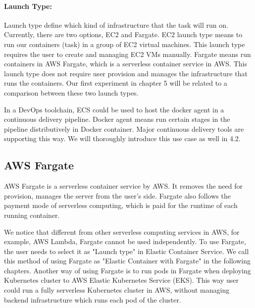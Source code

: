 \paragraph{Launch Type:} Launch type define which kind of infrastructure that the task will run on. Currently, there are two options, EC2 and Fargate. EC2 launch type means to run our containers (task) in a group of EC2 virtual machines. This launch type requires the user to create and managing EC2 VMs manually. Fargate means run containers in AWS Fargate, which is a serverless container service in AWS. This launch type does not require user provision and manages the infrastructure that runs the containers.  Our first experiment in chapter 5 will be related to a comparison between these two launch types.
\par
In a DevOps toolchain, ECS could be used to host the docker agent in a continuous delivery pipeline. Docker agent means run certain stages in the pipeline distributively in Docker container. Major continuous delivery tools are supporting this way. We will thoroughly introduce this use case as well in 4.2.
\subsection{AWS Fargate}
AWS Fargate is a serverless container service by AWS. It removes the need for provision, manages the server from the user's side. Fargate also follows the payment mode of serverless computing, which is paid for the runtime of each running container. 
\par
We notice that different from other serverless computing services in AWS, for example, AWS Lambda, Fargate cannot be used independently. To use Fargate, the user needs to select it as "Launch type" in Elastic Container Service. We call this method of using Fargate as "Elastic Container with Fargate" in the following chapters. Another way of using Fargate is to run pods in Fargate when deploying Kubernetes cluster to AWS Elastic Kubernetes Service (EKS). This way user could run a fully serverless Kubernetes cluster in AWS, without managing backend infrastructure which runs each pod of the cluster.
